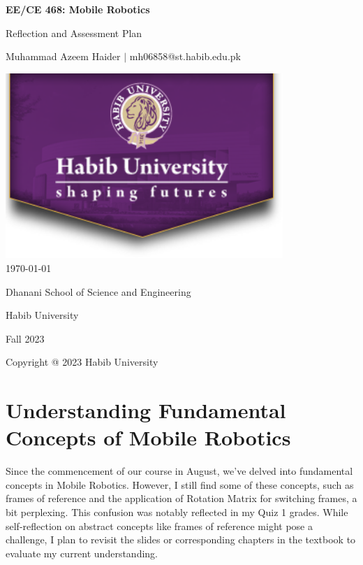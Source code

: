 \documentclass[12pt]{article}
\begin{document}
\begin{titlepage}
    \centering
    {\LARGE\textbf{EE/CE 468: Mobile Robotics}\par}
    \vspace{0.5cm}
    {\Large Reflection and Assessment Plan\par}
    \vspace*{\fill} %
    {\large Muhammad Azeem Haider $\mid$ mh06858@st.habib.edu.pk\par}
    \vspace{2cm}
    \includegraphics[height=7cm]{../HU_logo.png}\\\bigskip
    {\large \today}\\\bigskip\bigskip
    \vspace{2cm}
    {\large Dhanani School of Science and Engineering\par}
    {\large Habib University\par}
    {\large Fall 2023\par}
    \vspace*{\fill} %
    {\large Copyright @ 2023 Habib University\par}
\end{titlepage}

\thispagestyle{empty} %
\clearpage

\section{Understanding Fundamental Concepts of Mobile Robotics}

Since the commencement of our course in August, we've delved into fundamental concepts in Mobile Robotics. However, I still find some of these concepts, such as frames of reference and the application of Rotation Matrix for switching frames, a bit perplexing. This confusion was notably reflected in my Quiz 1 grades. While self-reflection on abstract concepts like frames of reference might pose a challenge, I plan to revisit the slides or corresponding chapters in the textbook to evaluate my current understanding.
\end{document}
